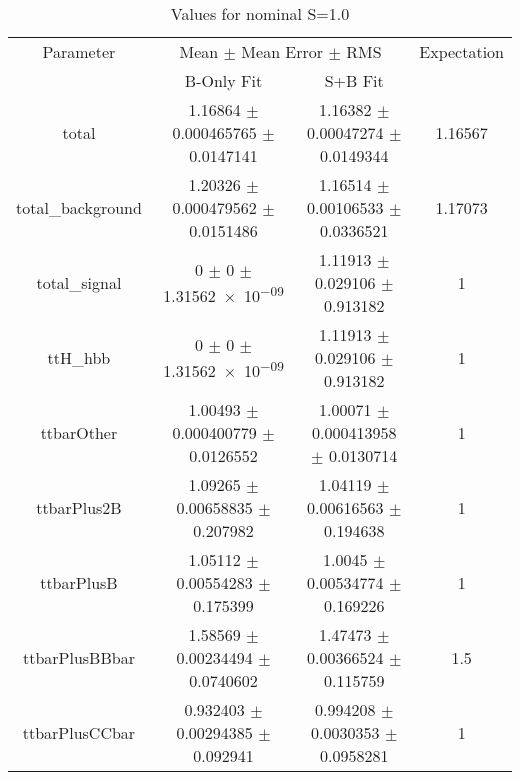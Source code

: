 \begin{table}
\centering
\caption{Values for nominal S=1.0}
\begin{tabular}{cccc}
\toprule
Parameter & \multicolumn{2}{c}{Mean $\pm$ Mean Error $\pm$ RMS} & Expectation\\
 & B-Only Fit & S+B Fit & \\
\midrule
total & \num{1.16864} $\pm$ \num{0.000465765} $\pm$ \num{0.0147141} & \num{1.16382} $\pm$ \num{0.00047274} $\pm$ \num{0.0149344} & \num{1.16567}\\
total\_background & \num{1.20326} $\pm$ \num{0.000479562} $\pm$ \num{0.0151486} & \num{1.16514} $\pm$ \num{0.00106533} $\pm$ \num{0.0336521} & \num{1.17073}\\
total\_signal & \num{0} $\pm$ \num{0} $\pm$ \num{1.31562e-09} & \num{1.11913} $\pm$ \num{0.029106} $\pm$ \num{0.913182} & \num{1}\\
ttH\_hbb & \num{0} $\pm$ \num{0} $\pm$ \num{1.31562e-09} & \num{1.11913} $\pm$ \num{0.029106} $\pm$ \num{0.913182} & \num{1}\\
ttbarOther & \num{1.00493} $\pm$ \num{0.000400779} $\pm$ \num{0.0126552} & \num{1.00071} $\pm$ \num{0.000413958} $\pm$ \num{0.0130714} & \num{1}\\
ttbarPlus2B & \num{1.09265} $\pm$ \num{0.00658835} $\pm$ \num{0.207982} & \num{1.04119} $\pm$ \num{0.00616563} $\pm$ \num{0.194638} & \num{1}\\
ttbarPlusB & \num{1.05112} $\pm$ \num{0.00554283} $\pm$ \num{0.175399} & \num{1.0045} $\pm$ \num{0.00534774} $\pm$ \num{0.169226} & \num{1}\\
ttbarPlusBBbar & \num{1.58569} $\pm$ \num{0.00234494} $\pm$ \num{0.0740602} & \num{1.47473} $\pm$ \num{0.00366524} $\pm$ \num{0.115759} & \num{1.5}\\
ttbarPlusCCbar & \num{0.932403} $\pm$ \num{0.00294385} $\pm$ \num{0.092941} & \num{0.994208} $\pm$ \num{0.0030353} $\pm$ \num{0.0958281} & \num{1}\\
\bottomrule
\end{tabular}
\end{table}